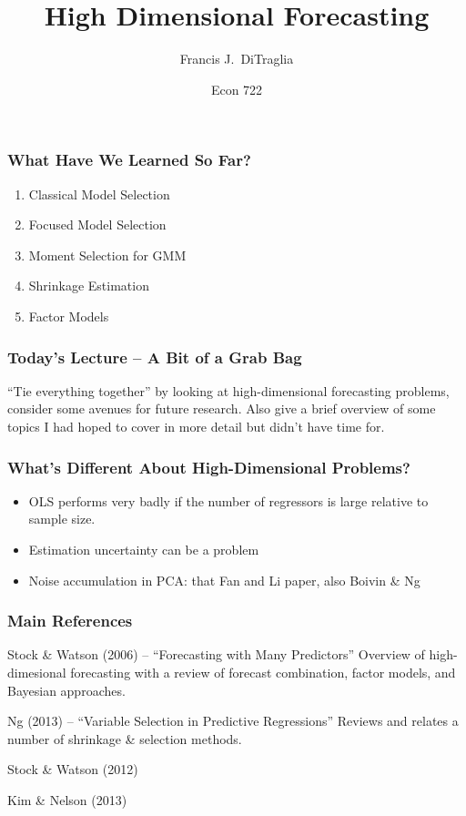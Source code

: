 \documentclass[handout]{beamer}
\title[Econ 722]{High Dimensional Forecasting}
\author[F. DiTraglia]{Francis J.\ DiTraglia}
\institute{University of Pennsylvania}
\date{Econ 722}
\begin{document}
 



\begin{frame}[plain]
	\titlepage 
	

\end{frame} 
\begin{frame}[c]\frametitle{What Have We Learned So Far?}
    
    \begin{enumerate}
    	\item Classical Model Selection
    	\item Focused Model Selection
    	\item Moment Selection for GMM
    	\item Shrinkage Estimation
    	\item Factor Models
    \end{enumerate}

\end{frame}
\begin{frame}[c]\frametitle{Today's Lecture -- A Bit of a Grab Bag}
    
``Tie everything together'' by looking at high-dimensional forecasting problems, consider some avenues for future research. Also give a brief overview of some topics I had hoped to cover in more detail but didn't have time for.

\end{frame}

\begin{frame}[c]\frametitle{What's Different About High-Dimensional Problems?}
    
\begin{itemize}
	\item OLS performs very badly if the number of regressors is large relative to sample size.
	\item Estimation uncertainty can be a problem
	\item Noise accumulation in PCA: that Fan and Li paper, also Boivin \& Ng
\end{itemize}

\end{frame}
\begin{frame}
	\frametitle{Main References}
	\begin{block}
		{Stock \& Watson (2006) -- ``Forecasting with Many Predictors''} Overview of high-dimesional forecasting with a review of forecast combination, factor models, and Bayesian approaches.
	\end{block}
	\begin{block}
		{Ng (2013) -- ``Variable Selection in Predictive Regressions''}
		Reviews and relates a number of shrinkage \& selection methods.
	\end{block}
	\begin{block}
		{Stock \& Watson (2012)}
	\end{block}
	\begin{block}
		{Kim \& Nelson (2013)}
	\end{block}
\end{frame}
\end{document}
